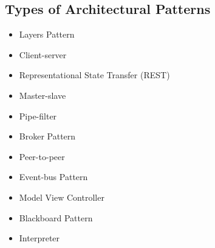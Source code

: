 \documentclass[a4paper,12pt]{article}
\begin{document}
\subsection{Types of Architectural Patterns}

\begin{itemize}
\item Layers Pattern
\item Client-server
\item Representational State Transfer (REST)
\item Master-slave
\item Pipe-filter
\item Broker Pattern
\item Peer-to-peer
\item Event-bus Pattern
\item Model View Controller
\item Blackboard Pattern
\item Interpreter
\end{itemize}
\end{document}
